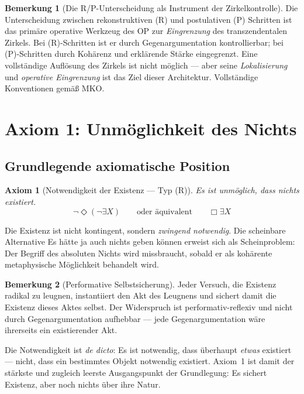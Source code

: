 \documentclass[11pt,a4paper]{article}
\theoremstyle{plain}
\newtheorem{axiom}{Axiom}[section]
\theoremstyle{definition}
\newtheorem{remark}{Bemerkung}[section]
\begin{document}
\begin{remark}[Die R/P-Unterscheidung als Instrument der Zirkelkontrolle]
Die Unterscheidung zwischen rekonstruktiven (R) und postulativen (P) Schritten ist das
prim\"{a}re operative Werkzeug des OP zur \emph{Eingrenzung} des transzendentalen Zirkels.
Bei (R)-Schritten ist er durch Gegenargumentation kontrollierbar; bei (P)-Schritten durch
Koh\"{a}renz und erkl\"{a}rende St\"{a}rke eingegrenzt. Eine vollst\"{a}ndige Aufl\"{o}sung
des Zirkels ist nicht m\"{o}glich --- aber seine \emph{Lokalisierung} und \emph{operative
Eingrenzung} ist das Ziel dieser Architektur. Vollst\"{a}ndige Konventionen gem\"{a}\ss{}
MKO.
\end{remark}

\section{Axiom 1: Unm\"{o}glichkeit des Nichts}

\subsection{Grundlegende axiomatische Position}

\begin{axiom}[Notwendigkeit der Existenz \textnormal{--- Typ (R)}]
Es ist unm\"{o}glich, dass nichts existiert.
\[
  \neg\Diamond(\neg\exists X)
  \qquad\text{oder \"{a}quivalent}\qquad
  \Box\exists X
\]
\end{axiom}

Die Existenz ist nicht kontingent, sondern \emph{zwingend notwendig}. Die scheinbare
Alternative \glqq{}Es h\"{a}tte ja auch nichts geben k\"{o}nnen\grqq{} erweist sich als
Scheinproblem: Der Begriff des absoluten Nichts wird missbraucht, sobald er als koh\"{a}rente
metaphysische M\"{o}glichkeit behandelt wird.

\begin{remark}[Performative Selbstsicherung]
Jeder Versuch, die Existenz radikal zu leugnen, instantiiert den Akt des Leugnens und
sichert damit die Existenz dieses Aktes selbst. Der Widerspruch ist performativ-reflexiv
und nicht durch Gegenargumentation aufhebbar --- jede Gegenargumentation w\"{a}re ihrerseits
ein existierender Akt.

Die Notwendigkeit ist \emph{de dicto}: Es ist notwendig, dass \"{u}berhaupt \emph{etwas}
existiert --- nicht, dass ein bestimmtes Objekt notwendig existiert. Axiom~1 ist damit der
st\"{a}rkste und zugleich leerste Ausgangspunkt der Grundlegung: Es sichert Existenz, aber
noch nichts \"{u}ber ihre Natur.
\end{remark}
\end{document}
